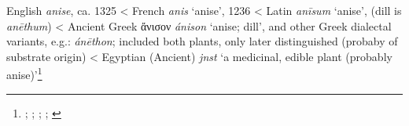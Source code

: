 \begin{etymology}\label{ety:anise}
English \textit{anise}, ca. 1325
< French \textit{anis} `anise', 1236
< Latin \textit{anīsum} `anise', (dill is \textit{anēthum})
< Ancient Greek {ἄνισον} \textit{ánison} `anise; dill', and other Greek dialectal variants, e.g.: \textit{ánēthon}; included both plants, only later distinguished (probaby of substrate origin)
< Egyptian (Ancient) \textit{jnst} `a medicinal, edible plant (probably anise)'\footnote{\textcites[anise]{oed}[anise]{ahd}; \textcite[anis]{tlfi}; \textcite{lewis_latin_1879}; \textcite{liddell_greek-english_1940}; \textcites[99]{erman_worterbuch_1926}[240]{hemmerdinger_noms_1968}}
\end{etymology}